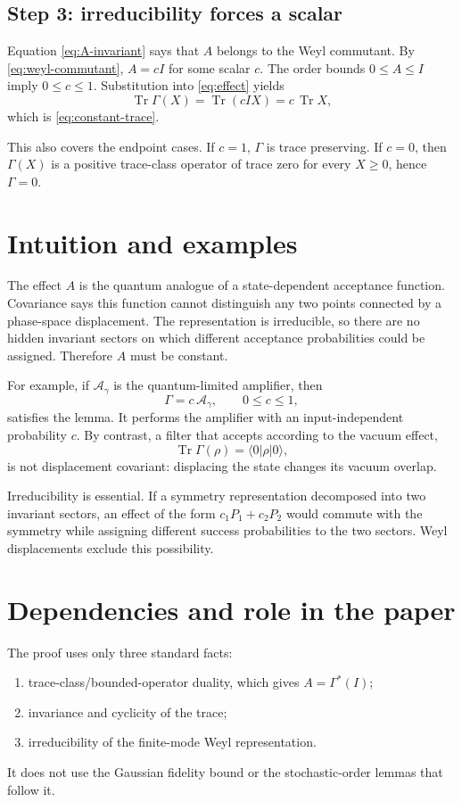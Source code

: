 \documentclass[11pt]{article}
\newcommand{\Tr}{\operatorname{Tr}}
\begin{document}
\subsection*{Step 3: irreducibility forces a scalar}

Equation \eqref{eq:A-invariant} says that $A$ belongs to the Weyl commutant.
By \eqref{eq:weyl-commutant}, $A=cI$ for some scalar $c$.  The order bounds
$0\leq A\leq I$ imply $0\leq c\leq1$.  Substitution into
\eqref{eq:effect} yields
\[
  \Tr\Gamma(X)=\Tr(cIX)=c\,\Tr X,
\]
which is \eqref{eq:constant-trace}.

This also covers the endpoint cases.  If $c=1$, $\Gamma$ is trace
preserving.  If $c=0$, then $\Gamma(X)$ is a positive trace-class operator of
trace zero for every $X\geq0$, hence $\Gamma=0$.

\section{Intuition and examples}

The effect $A$ is the quantum analogue of a state-dependent acceptance
function.  Covariance says this function cannot distinguish any two points
connected by a phase-space displacement.  The representation is
irreducible, so there are no hidden invariant sectors on which different
acceptance probabilities could be assigned.  Therefore $A$ must be
constant.

For example, if $\mathcal A_\gamma$ is the quantum-limited amplifier, then
\[
  \Gamma=c\,\mathcal A_\gamma,
  \qquad 0\leq c\leq1,
\]
satisfies the lemma.  It performs the amplifier with an input-independent
probability $c$.  By contrast, a filter that accepts according to the vacuum
effect,
\[
  \Tr\Gamma(\rho)=\langle0|\rho|0\rangle,
\]
is not displacement covariant: displacing the state changes its vacuum
overlap.

Irreducibility is essential.  If a symmetry representation decomposed into
two invariant sectors, an effect of the form
$c_1P_1+c_2P_2$ would commute with the symmetry while assigning different
success probabilities to the two sectors.  Weyl displacements exclude this
possibility.

\section{Dependencies and role in the paper}

The proof uses only three standard facts:
\begin{enumerate}
  \item trace-class/bounded-operator duality, which gives
  $A=\Gamma^*(I)$;
  \item invariance and cyclicity of the trace;
  \item irreducibility of the finite-mode Weyl representation.
\end{enumerate}
It does not use the Gaussian fidelity bound or the stochastic-order lemmas
that follow it.
\end{document}
